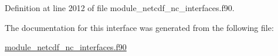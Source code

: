 Definition at line 2012 of file module\+\_\+netcdf\+\_\+nc\+\_\+interfaces.\+f90.



The documentation for this interface was generated from the following file\+:\begin{DoxyCompactItemize}
\item 
\hyperlink{module__netcdf__nc__interfaces_8f90}{module\+\_\+netcdf\+\_\+nc\+\_\+interfaces.\+f90}\end{DoxyCompactItemize}
